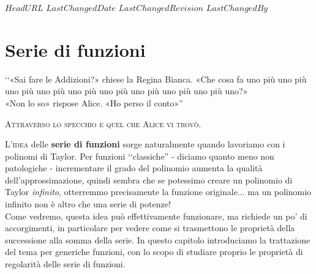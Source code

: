 \svnidlong
{$HeadURL$}
{$LastChangedDate$}
{$LastChangedRevision$}
{$LastChangedBy$}

\chapter{Serie di funzioni}

\begin{introduction}
	‘‘«Sai fare le Addizioni?» chiese la Regina Bianca. «Che cosa fa uno più uno più uno	più uno più uno più uno più uno più uno più uno più uno?»\\
	«Non lo so» rispose Alice. «Ho perso il conto»''
\begin{flushright}
	\textsc{Attraverso lo specchio e quel che Alice vi trovò.}
\end{flushright}
\end{introduction}
\lettrine[findent=1pt, nindent=0pt]{L}{'idea} delle \textbf{serie di funzioni} sorge naturalmente quando lavoriamo con i polinomi di Taylor. Per funzioni ‘‘classiche'' - diciamo quanto meno non patologiche - incrementare il grado del polinomio aumenta la qualità dell'approssimazione, quindi sembra che se potessimo creare un polinomio di Taylor \textit{infinito}, otterremmo precisamente la funzione originale... ma un polinomio infinito non è altro che una serie di potenze!\\
Come vedremo, questa idea può effettivamente funzionare, ma richiede un po' di accorgimenti, in particolare per vedere come si trasmettono le proprietà della successione alla somma della serie. In questo capitolo introduciamo la trattazione del tema per generiche funzioni, con lo scopo di studiare proprio le proprietà di regolarità delle serie di funzioni.
